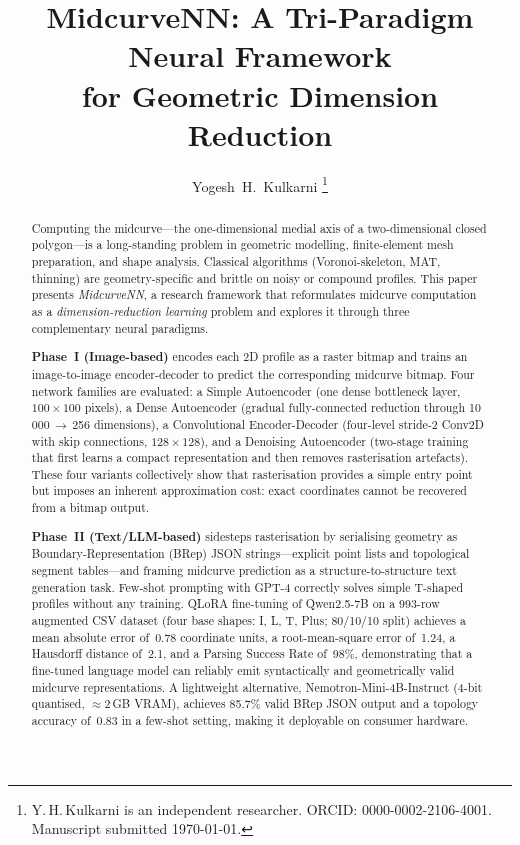\documentclass[journal]{IEEEtran}
\title{MidcurveNN: A Tri-Paradigm Neural Framework\\for Geometric Dimension Reduction}
\author{Yogesh~H.~Kulkarni%
  \thanks{Y.\,H.\,Kulkarni is an independent researcher.
    ORCID: 0000-0002-2106-4001.
    Manuscript submitted \today.}}
\begin{document}
\maketitle

\begin{abstract}
Computing the midcurve—the one-dimensional medial axis of a two-dimensional
closed polygon—is a long-standing problem in geometric modelling, finite-element
mesh preparation, and shape analysis.  Classical algorithms (Voronoi-skeleton,
MAT, thinning) are geometry-specific and brittle on noisy or compound profiles.
This paper presents \textit{MidcurveNN}, a research framework that reformulates
midcurve computation as a \emph{dimension-reduction learning} problem and
explores it through three complementary neural paradigms.

\textbf{Phase~I (Image-based)} encodes each 2D profile as a raster bitmap and
trains an image-to-image encoder-decoder to predict the corresponding midcurve
bitmap.  Four network families are evaluated: a Simple Autoencoder (one dense
bottleneck layer, $100\!\times\!100$ pixels), a Dense Autoencoder (gradual
fully-connected reduction through 10\,000\,$\to$\,256 dimensions), a
Convolutional Encoder-Decoder (four-level stride-2 Conv2D with skip
connections, $128\!\times\!128$), and a Denoising Autoencoder (two-stage
training that first learns a compact representation and then removes
rasterisation artefacts).  These four variants collectively show that
rasterisation provides a simple entry point but imposes an inherent
approximation cost: exact coordinates cannot be recovered from a bitmap output.

\textbf{Phase~II (Text/LLM-based)} sidesteps rasterisation by serialising
geometry as Boundary-Representation (BRep) JSON strings—explicit point lists
and topological segment tables—and framing midcurve prediction as a
structure-to-structure text generation task.  Few-shot prompting with GPT-4
correctly solves simple T-shaped profiles without any training.  QLoRA
fine-tuning of Qwen2.5-7B on a 993-row augmented CSV dataset (four base shapes:
I, L, T, Plus; 80/10/10 split) achieves a mean absolute error of~0.78
coordinate units, a root-mean-square error of~1.24, a Hausdorff distance
of~2.1, and a Parsing Success Rate of~98\%, demonstrating that a
fine-tuned language model can reliably emit syntactically and geometrically
valid midcurve representations.  A lightweight alternative,
Nemotron-Mini-4B-Instruct (4-bit quantised, $\approx$2\,GB VRAM), achieves
85.7\% valid BRep JSON output and a topology accuracy of~0.83 in a few-shot
setting, making it deployable on consumer hardware.


\end{abstract}
\end{document}

